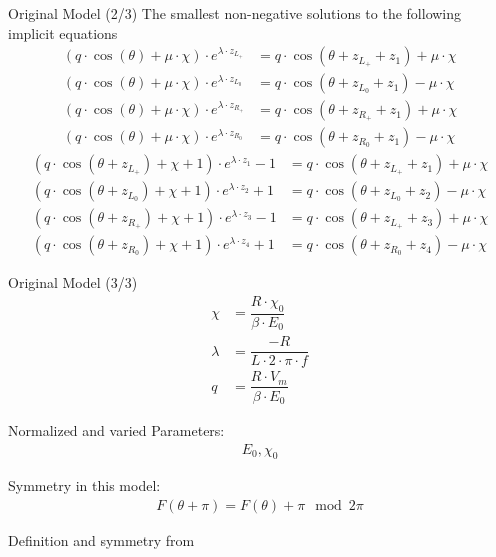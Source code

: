 \begin{frame}{Original Model (2/3)}
	The smallest non-negative solutions to the following implicit equations
	\begin{subequations}
		\begin{align}
			(q \cdot \cos(\theta) + \mu \cdot \chi) \cdot e^{\lambda \cdot z_{L_+}}
			 & = q \cdot \cos(\theta + z_{L_+} + z_1) + \mu \cdot \chi \\
			(q \cdot \cos(\theta) + \mu \cdot \chi) \cdot e^{\lambda \cdot z_{L_0}}
			 & = q \cdot \cos(\theta + z_{L_0} + z_1) - \mu \cdot \chi \\
			(q \cdot \cos(\theta) + \mu \cdot \chi) \cdot e^{\lambda \cdot z_{R_+}}
			 & = q \cdot \cos(\theta + z_{R_+} + z_1) + \mu \cdot \chi \\
			(q \cdot \cos(\theta) + \mu \cdot \chi) \cdot e^{\lambda \cdot z_{R_0}}
			 & = q \cdot \cos(\theta + z_{R_0} + z_1) - \mu \cdot \chi
		\end{align}
	\end{subequations}
	\vspace{-2em}
	\begin{subequations}
		\begin{align}
			(q \cdot \cos(\theta + z_{L_+}) + \chi + 1) \cdot e^{\lambda \cdot z_1} - 1
			 & = q \cdot  \cos(\theta + z_{L_+} + z_1) + \mu \cdot \chi \\
			(q \cdot \cos(\theta + z_{L_0}) + \chi + 1) \cdot e^{\lambda \cdot z_2} + 1
			 & = q \cdot  \cos(\theta + z_{L_0} + z_2) - \mu \cdot \chi \\
			(q \cdot \cos(\theta + z_{R_+}) + \chi + 1) \cdot e^{\lambda \cdot z_3} - 1
			 & = q \cdot  \cos(\theta + z_{L_+} + z_3) + \mu \cdot \chi \\
			(q \cdot \cos(\theta + z_{R_0}) + \chi + 1) \cdot e^{\lambda \cdot z_4} + 1
			 & = q \cdot  \cos(\theta + z_{R_0} + z_4) - \mu \cdot \chi
		\end{align}
	\end{subequations}
\end{frame}

\begin{frame}{Original Model (3/3)}
	\vspace{-3.0em}
	\begin{align}
		\chi    & = \dfrac{R \cdot \chi_0}{\beta \cdot E_0} \\
		\lambda & = \dfrac{-R}{L \cdot 2 \cdot \pi \cdot f} \\
		q       & = \dfrac{R \cdot V_m}{\beta \cdot E_0}
	\end{align}

	Normalized and varied Parameters:
	\begin{align*}
		E_0, \chi_0
	\end{align*}

	Symmetry in this model:
	\begin{align}
		F(\theta + \pi) = F(\theta) + \pi \mod 2 \pi
	\end{align}

	\begin{flushright}
		Definition and symmetry from \cite{akyuz2022}
	\end{flushright}
\end{frame}

